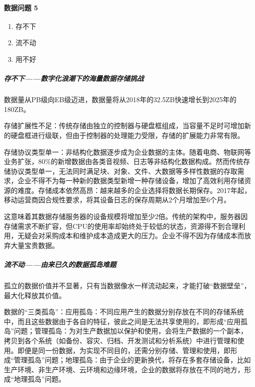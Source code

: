 \documentclass[letterpaper,10pt,english]{sphinxmanual}
\begin{document}
\paragraph{数据问题 5\sphinxfootnotemark[389]}
\label{\detokenize{chapter_idea/data:id24}}%
\begin{footnotetext}[389]\sphinxAtStartFootnote
{}
%
\end{footnotetext}\ignorespaces \begin{enumerate}
%
\item {} 
存不下

\item {} 
流不动

\item {} 
用不好

\end{enumerate}


\subparagraph{存不下——数字化浪潮下的海量数据存储挑战}
\label{\detokenize{chapter_idea/data:id25}}
数据量从PB级向EB级迈进，数据量将从2018年的32.5ZB快速增长到2025年的180ZB。

存储扩展性不足：传统存储由独立的控制器与硬盘框组成，当容量不足时可增加新的硬盘框进行级联，但由于控制器的处理能力受限，存储的扩展能力非常有限。

存储协议类型单一：非结构化数据逐步成为企业数据的主体。随着电商、物联网等业务扩张，80\%的新增数据由各类音视频、日志等非结构化数据构成。然而传统存储协议类型单一，无法同时满足块、对象、文件、大数据等多样性数据的存取需求，企业不得不为每一种新的数据类型新增一种存储设备，增加了高效利用存储资源的难度。存储成本依然高昂：越来越多的企业选择将数据长期保存。2017年起，移动运营商因合规性要求，将其设备日志的保存周期从2个月增加至6个月。

这意味着其数据存储服务器的设备规模将增加至少2倍。传统的架构中，服务器因存储需求不断扩容，但CPU的使用率却始终处于较低的状态，资源得不到合理利用，无疑会对采购成本和维护成本造成更大的压力。企业不得不因为存储成本而放弃大量宝贵数据。


\subparagraph{流不动——由来已久的数据孤岛难题}
\label{\detokenize{chapter_idea/data:id26}}
孤立的数据价值并不显著，只有当数据像水一样流动起来，才能打破“数据壁垒”，最大化释放其价值。

数据的“三类孤岛”：应用孤岛：不同应用产生的数据分别存放在不同的存储系统中，而且这些数据由于各自的特征，彼此之间是无法共享使用的，即形成“应用孤岛”问题；管理孤岛：为对生产数据加以保护和使用，会将生产数据的一个副本，拷贝到各个系统（如备份、容灾、归档、开发测试和分析系统）中进行管理和使用。即便是同一份数据，为实现不同目的，还需分别存储、管理和使用，即形成“管理孤岛”问题；地理孤岛：由于企业的更新换代，将存在多套存储设备，比如生产环境、非生产环境、云环境和边缘环境，企业的数据将存放在不同的地方，形成“地理孤岛”问题。
\end{document}
